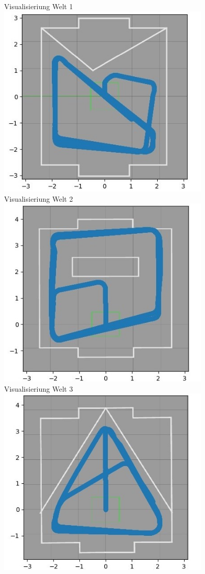 \documentclass[12pt, a4paper]{report}
\begin{document}
\begin{centering}
Visualisieriung Welt 1\\
\includegraphics[width=290pt]{roboter_pfad1.jpg}\\
Visualisieriung Welt 2\\
\includegraphics[width=290pt]{roboter_pfad2.jpg}\newpage
~\\
Visualisieriung Welt 3\\
\includegraphics[width=290pt]{roboter_pfad3.jpg}\\

\end{centering}
\end{document}
